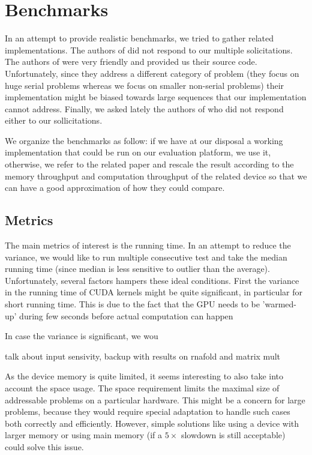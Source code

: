 \section{Benchmarks} \label{benchmarks}
In an attempt to provide realistic benchmarks, we tried to gather related implementations. The authors of \cite{gpu_atlp} did not respond to our multiple solicitations. The authors of \cite{swat_mega} were very friendly and provided us their source code. Unfortunately, since they address a different category of problem (they focus on huge serial problems whereas we focus on smaller non-serial problems) their implementation might be biased towards large sequences that our implementation cannot address. Finally, we asked lately the authors of \cite{gpu_rnafold} who did not respond either to our sollicitations.

We organize the benchmarks as follow: if we have at our disposal a working implementation that could be run on our evaluation platform, we use it, otherwise, we refer to the related paper and rescale the result according to the memory throughput and computation throughput of the related device so that we can have a good approximation of how they could compare.

\subsection{Metrics}
The main metrics of interest is the running time. In an attempt to reduce the variance, we would like to run multiple consecutive test and take the median running time (since median is less sensitive to outlier than the average). Unfortunately, several factors hampers these ideal conditions. First the variance in the running time of CUDA kernels might be quite significant, in particular for short running time. This is due to the fact that the GPU needs to be 'warmed-up' during few seconds before actual computation can happen

  In case the variance is significant, we wou

talk about input sensivity, backup with results on rnafold and matrix mult

As the device memory is quite limited, it seems interesting to also take into account the space usage. The space requirement limits the maximal size of addressable problems  on a particular hardware. This might be a concern for large problems, because they would require special adaptation to handle such cases both correctly and efficiently. However, simple solutions like using a device with larger memory or using main memory (if a $5\times$ slowdown is still acceptable) could solve this issue.

